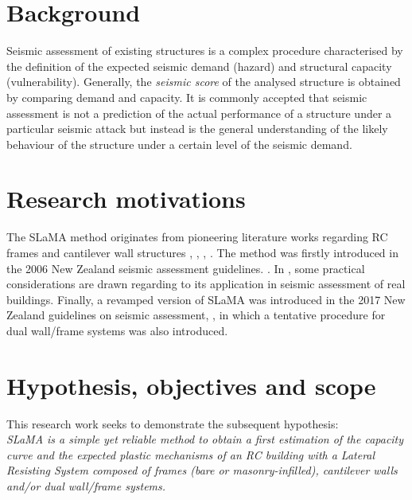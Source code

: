 \section*{Background} 

Seismic assessment of existing structures is a complex procedure characterised by the definition of the expected seismic demand (hazard) and structural capacity (vulnerability). Generally, the \textit{seismic score} of the analysed structure is obtained by comparing demand and capacity. It is commonly accepted that seismic assessment is not a prediction of the actual performance of a structure under a particular seismic attack but instead is the general understanding of the likely behaviour of the structure under a certain level of the seismic demand.


\section*{Research motivations}

The SLaMA method originates from pioneering literature works regarding RC frames and cantilever wall structures , \cite{priestley1991}, \cite{park1995}, \cite{priestley1997}. The method was firstly introduced in the 2006 New Zealand seismic assessment guidelines. \cite{NZSEE2006}. In \cite{kam2013}, some practical considerations are drawn regarding to its application in seismic assessment of real buildings. Finally, a revamped version of SLaMA was introduced in the 2017 New Zealand guidelines on seismic assessment, \cite{NZSEE2016}, in which a tentative procedure for dual wall/frame systems was also introduced.


\section*{Hypothesis, objectives and scope}


This research work seeks to demonstrate the subsequent hypothesis: \\

\textit{SLaMA is a simple yet reliable method to obtain a first estimation of the capacity curve and the expected plastic mechanisms of an RC building with a Lateral Resisting System composed of frames (bare or masonry-infilled), cantilever walls and/or dual wall/frame systems.}\\


